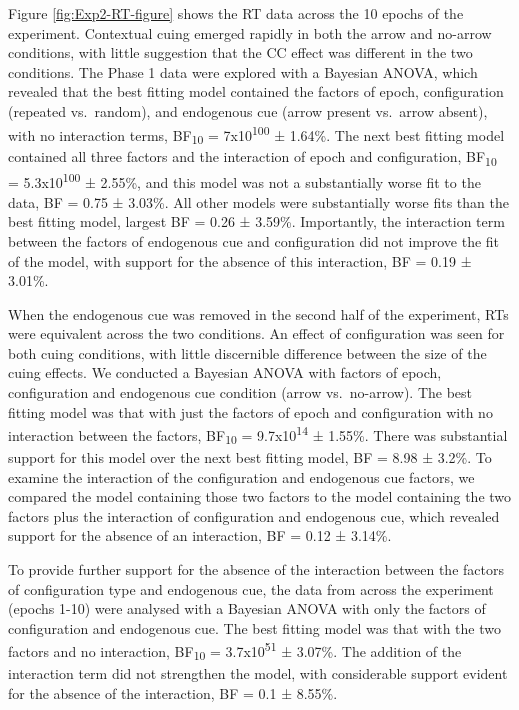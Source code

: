 \documentclass[
  man,floatsintext]{apa7}
\begin{document}
Figure \ref{fig:Exp2-RT-figure} shows the RT data across the 10 epochs of the experiment. Contextual cuing emerged rapidly in both the arrow and no-arrow conditions, with little suggestion that the CC effect was different in the two conditions. The Phase 1 data were explored with a Bayesian ANOVA, which revealed that the best fitting model contained the factors of epoch, configuration (repeated vs.~random), and endogenous cue (arrow present vs.~arrow absent), with no interaction terms, BF\textsubscript{10} = 7x10\textsuperscript{100} ± 1.64\%. The next best fitting model contained all three factors and the interaction of epoch and configuration, BF\textsubscript{10} = 5.3x10\textsuperscript{100} ± 2.55\%, and this model was not a substantially worse fit to the data, BF = 0.75 ± 3.03\%. All other models were substantially worse fits than the best fitting model, largest BF = 0.26 ± 3.59\%. Importantly, the interaction term between the factors of endogenous cue and configuration did not improve the fit of the model, with support for the absence of this interaction, BF = 0.19 ± 3.01\%.

When the endogenous cue was removed in the second half of the experiment, RTs were equivalent across the two conditions. An effect of configuration was seen for both cuing conditions, with little discernible difference between the size of the cuing effects. We conducted a Bayesian ANOVA with factors of epoch, configuration and endogenous cue condition (arrow vs.~no-arrow). The best fitting model was that with just the factors of epoch and configuration with no interaction between the factors, BF\textsubscript{10} = 9.7x10\textsuperscript{14} ± 1.55\%. There was substantial support for this model over the next best fitting model, BF = 8.98 ± 3.2\%. To examine the interaction of the configuration and endogenous cue factors, we compared the model containing those two factors to the model containing the two factors plus the interaction of configuration and endogenous cue, which revealed support for the absence of an interaction, BF = 0.12 ± 3.14\%.

To provide further support for the absence of the interaction between the factors of configuration type and endogenous cue, the data from across the experiment (epochs 1-10) were analysed with a Bayesian ANOVA with only the factors of configuration and endogenous cue. The best fitting model was that with the two factors and no interaction, BF\textsubscript{10} = 3.7x10\textsuperscript{51} ± 3.07\%. The addition of the interaction term did not strengthen the model, with considerable support evident for the absence of the interaction, BF = 0.1 ± 8.55\%.
\end{document}
